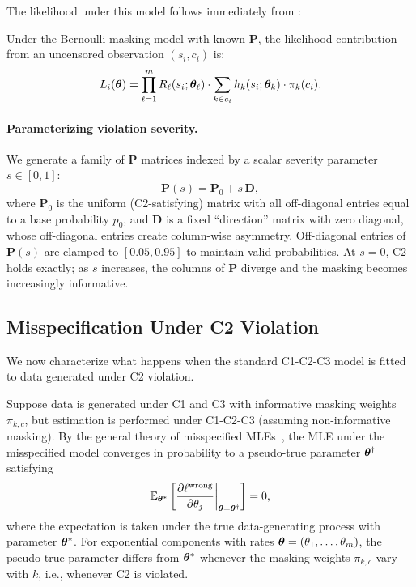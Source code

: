 The likelihood under this model follows immediately from
:

\begin{corollary}
\label{cor:bernoulli-like}
Under the Bernoulli masking model with known $\mathbf{P}$, the likelihood
contribution from an uncensored observation $(s_i, c_i)$ is:
\begin{equation}
\label{eq:bernoulli-like}
    L_i(\bm{\theta}) = \prod_{\ell=1}^m R_\ell(s_i; \bm{\theta}_\ell) \cdot
    \sum_{k \in c_i} h_k(s_i; \bm{\theta}_k) \cdot \pi_k(c_i).
\end{equation}
\end{corollary}

\paragraph{Parameterizing violation severity.}
We generate a family of $\mathbf{P}$ matrices indexed by a scalar severity
parameter $s \in [0,1]$:
\begin{equation}
\label{eq:P-sweep}
    \mathbf{P}(s) = \mathbf{P}_0 + s\,\mathbf{D},
\end{equation}
where $\mathbf{P}_0$ is the uniform (C2-satisfying) matrix with all
off-diagonal entries equal to a base probability $p_0$, and $\mathbf{D}$ is a
fixed ``direction'' matrix with zero diagonal, whose off-diagonal entries
create column-wise asymmetry. Off-diagonal entries of $\mathbf{P}(s)$ are
clamped to $[0.05, 0.95]$ to maintain valid probabilities. At $s = 0$, C2
holds exactly; as $s$ increases, the columns of $\mathbf{P}$ diverge and the
masking becomes increasingly informative.

\subsection{Misspecification Under C2 Violation}
\label{sec:misspec}

We now characterize what happens when the standard C1-C2-C3 model is fitted
to data generated under C2 violation.

\begin{theorem}
\label{thm:misspec-C2}
Suppose data is generated under C1 and C3 with informative masking weights
$\pi_{k,c}$, but estimation is performed under C1-C2-C3 (assuming
non-informative masking). By the general theory of misspecified
MLEs~\citep{white1982misspecified, huber1967behavior}, the MLE under the
misspecified model converges in probability to a pseudo-true parameter
$\bm{\theta}^{\dagger}$ satisfying
\begin{equation}
\label{eq:pseudo-true}
    \mathbb{E}_{\bm{\theta}^*}\left[\frac{\partial \ell^{\mathrm{wrong}}}{\partial
    \theta_j}\bigg|_{\bm{\theta} = \bm{\theta}^{\dagger}}\right] = 0,
\end{equation}
where the expectation is taken under the true data-generating process with
parameter $\bm{\theta}^*$. For exponential components with rates
$\bm{\theta} = (\theta_1, \ldots, \theta_m)$, the pseudo-true parameter differs
from $\bm{\theta}^*$ whenever the masking weights $\pi_{k,c}$ vary with $k$,
i.e., whenever C2 is violated.
\end{theorem}

